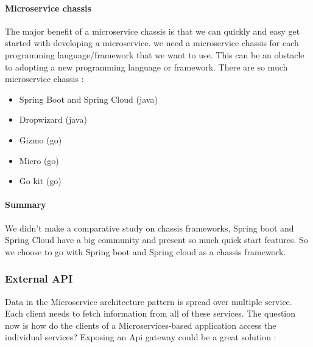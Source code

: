 \paragraph{Microservice chassis}
\label{sec:sec01}
The major benefit of a microservice chassis is that we can quickly and easy get started with developing a
 microservice.
we need a microservice chassis for each programming language/framework that we want to use.
 This can be an obstacle to adopting a new programming language or framework.
 There are so much microservice chassis :
\begin{itemize}
  \item Spring Boot and Spring Cloud (java)
  \item Dropwizard (java)
  \item Gizmo (go)
  \item Micro (go)
  \item Go kit (go)
 \end{itemize}
\paragraph{Summary}
\label{sec:sec01}
We didn't make a comparative study on chassis frameworks, 
Spring boot and Spring Cloud have a big community and present so much quick start features.
So we choose to go with Spring boot and Spring cloud as a chassis framework.

\subsubsection{External API}
\label{sec:sec01}
Data in the Microservice architecture pattern is spread over multiple service. Each client needs to fetch information from all of these services.
The question now is how do the clients of a Microservices-based application access the individual services?
Exposing an Api gateway could be a great solution :

